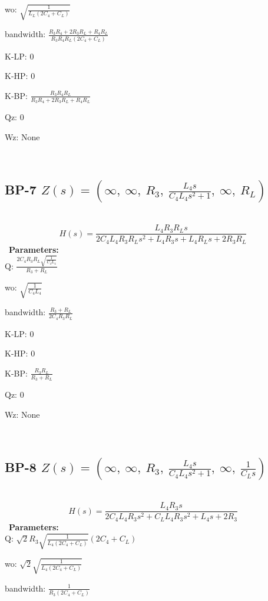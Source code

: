 \documentclass{article}
\begin{document}
wo: $\sqrt{\frac{1}{L_{L} \left(2 C_{4} + C_{L}\right)}}$\ 

bandwidth: $\frac{R_{3} R_{4} + 2 R_{3} R_{L} + R_{4} R_{L}}{R_{3} R_{4} R_{L} \left(2 C_{4} + C_{L}\right)}$\ 

K-LP: $0$\ 

K-HP: $0$\ 

K-BP: $\frac{R_{3} R_{4} R_{L}}{R_{3} R_{4} + 2 R_{3} R_{L} + R_{4} R_{L}}$\ 

Qz: $0$\ 

Wz: $\text{None}$\ 

\ 

\subsection{BP-7 $Z(s) = \left( \infty, \  \infty, \  R_{3}, \  \frac{L_{4} s}{C_{4} L_{4} s^{2} + 1}, \  \infty, \  R_{L}\right)$ } \ 
\textbf{\[H(s) = \frac{L_{4} R_{3} R_{L} s}{2 C_{4} L_{4} R_{3} R_{L} s^{2} + L_{4} R_{3} s + L_{4} R_{L} s + 2 R_{3} R_{L}}\] } \ 
\textbf{Parameters:}\\ 

Q: $\frac{2 C_{4} R_{3} R_{L} \sqrt{\frac{1}{C_{4} L_{4}}}}{R_{3} + R_{L}}$\ 

wo: $\sqrt{\frac{1}{C_{4} L_{4}}}$\ 

bandwidth: $\frac{R_{3} + R_{L}}{2 C_{4} R_{3} R_{L}}$\ 

K-LP: $0$\ 

K-HP: $0$\ 

K-BP: $\frac{R_{3} R_{L}}{R_{3} + R_{L}}$\ 

Qz: $0$\ 

Wz: $\text{None}$\ 

\ 

\subsection{BP-8 $Z(s) = \left( \infty, \  \infty, \  R_{3}, \  \frac{L_{4} s}{C_{4} L_{4} s^{2} + 1}, \  \infty, \  \frac{1}{C_{L} s}\right)$ } \ 
\textbf{\[H(s) = \frac{L_{4} R_{3} s}{2 C_{4} L_{4} R_{3} s^{2} + C_{L} L_{4} R_{3} s^{2} + L_{4} s + 2 R_{3}}\] } \ 
\textbf{Parameters:}\\ 

Q: $\sqrt{2} R_{3} \sqrt{\frac{1}{L_{4} \left(2 C_{4} + C_{L}\right)}} \left(2 C_{4} + C_{L}\right)$\ 

wo: $\sqrt{2} \sqrt{\frac{1}{L_{4} \left(2 C_{4} + C_{L}\right)}}$\ 

bandwidth: $\frac{1}{R_{3} \left(2 C_{4} + C_{L}\right)}$\ 
\end{document}
